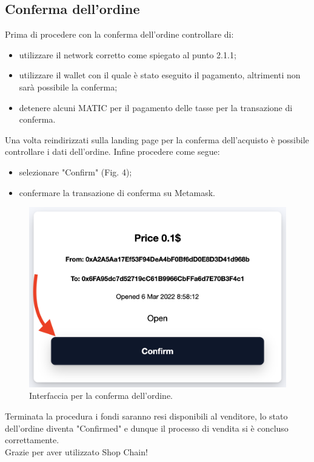 \documentclass[a4paper, 12pt]{article}
\begin{document}
\subsection{Conferma dell'ordine}
Prima di procedere con la conferma dell'ordine controllare di:
\begin{itemize}
\item utilizzare il network corretto come spiegato al punto 2.1.1;
\item utilizzare il wallet con il quale è stato eseguito il pagamento, altrimenti non sarà possibile la conferma;
\item detenere alcuni MATIC per il pagamento delle tasse per la transazione di conferma.
\end{itemize}
Una volta reindirizzati sulla landing page per la conferma dell'acquisto è possibile controllare i dati dell'ordine. Infine procedere come segue:
\begin{itemize}
\item selezionare "Confirm" (Fig. 4);
\item confermare la transazione di conferma su Metamask.
\end{itemize}
\FloatBarrier
\begin{figure}[!h]
\centering
\includegraphics[width=0.5\linewidth]{img/conferma_ordine.png}
\caption{Interfaccia per la conferma dell'ordine.}
\end{figure}
\FloatBarrier
Terminata la procedura i fondi saranno resi disponibili al venditore, lo stato dell'ordine diventa "Confirmed" e dunque il processo di vendita si è concluso correttamente.
\\Grazie per aver utilizzato Shop Chain!
\end{document}
